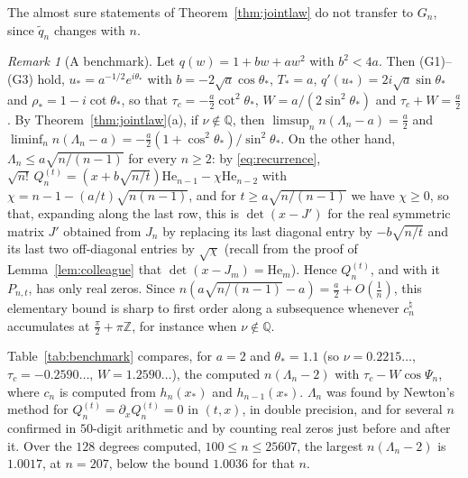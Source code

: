 \documentclass[11pt]{amsart}
\theoremstyle{definition}
\theoremstyle{remark}
\newtheorem{remark}[theorem]{Remark}
\numberwithin{equation}{section}
\newcommand{\Q}{\mathbb{Q}}
\newcommand{\Z}{\mathbb{Z}}
\newcommand{\He}{\mathrm{He}}
\begin{document}
The almost sure statements of Theorem~\ref{thm:jointlaw} do not transfer to $G_n$, since $\tilde q_n$ changes with $n$.

\begin{remark}[A benchmark]\label{rem:benchmark}
Let $q(w)=1+bw+aw^2$ with $b^2<4a$. Then (G1)--(G3) hold, $u_*=a^{-1/2}e^{i\theta_*}$ with $b=-2\sqrt a\cos\theta_*$,
$T_*=a$, $q'(u_*)=2i\sqrt a\sin\theta_*$ and $\rho_*=1-i\cot\theta_*$, so that $\tau_c=-\frac a2\cot^2\theta_*$,
$W=a/(2\sin^2\theta_*)$ and $\tau_c+W=\frac a2$. By Theorem~\ref{thm:jointlaw}(a), if $\nu\notin\Q$, then
$\limsup_nn(\Lambda_n-a)=\frac a2$ and $\liminf_nn(\Lambda_n-a)=-\frac a2(1+\cos^2\theta_*)/\sin^2\theta_*$. On the other
hand, $\Lambda_n\le a\sqrt{n/(n-1)}$ for every $n\ge2$: by \eqref{eq:recurrence},
$\sqrt{n!}\,Q_n^{(t)}=(x+b\sqrt{n/t})\He_{n-1}-\chi\He_{n-2}$ with $\chi=n-1-(a/t)\sqrt{n(n-1)}$, and for
$t\ge a\sqrt{n/(n-1)}$ we have $\chi\ge0$, so that, expanding along the last row, this is $\det(x-J')$ for the real
symmetric matrix $J'$ obtained from $J_n$ by replacing its last diagonal entry by $-b\sqrt{n/t}$ and its last two
off-diagonal entries by $\sqrt\chi$ (recall from the proof of Lemma~\ref{lem:colleague} that $\det(x-J_m)=\He_m$). Hence $Q_n^{(t)}$, and with it $P_{n,t}$, has only
real zeros. Since $n(a\sqrt{n/(n-1)}-a)=\frac a2+O(\frac1n)$, this elementary bound is sharp to first order along a
subsequence whenever $c_n^\natural$ accumulates at $\frac\pi2+\pi\Z$, for instance when $\nu\notin\Q$.

Table~\ref{tab:benchmark} compares, for $a=2$ and $\theta_*=1.1$ (so $\nu=0.2215\ldots$, $\tau_c=-0.2590\ldots$,
$W=1.2590\ldots$), the computed $n(\Lambda_n-2)$ with $\tau_c-W\cos\Psi_n$, where $c_n$ is computed from $h_n(x_*)$ and
$h_{n-1}(x_*)$. $\Lambda_n$ was found by Newton's method for $Q_n^{(t)}=\partial_xQ_n^{(t)}=0$ in $(t,x)$, in double
precision, and for several $n$ confirmed in $50$-digit arithmetic and by counting real zeros just before and after it.
Over the $128$ degrees computed, $100\le n\le25607$, the largest $n(\Lambda_n-2)$ is $1.0017$, at $n=207$, below the bound
$1.0036$ for that $n$.
\end{remark}
\end{document}
